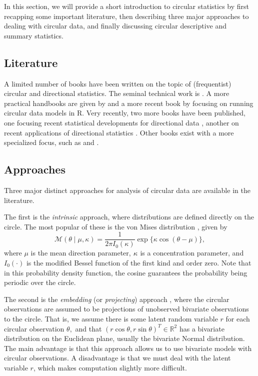 \documentclass[12pt, a4paper]{book}\usepackage[]{graphicx}\usepackage[]{color}
\let\proglang=\textsf
\begin{document}
In this section, we will provide a short introduction to circular statistics by first recapping some important literature, then describing three major approaches to dealing with circular data, and finally discussing circular descriptive and summary statistics.

\subsection*{Literature}

A limited number of books have been written on the topic of (frequentist) circular and directional statistics. The seminal technical work is \citet{mardia2009directional}. A more practical handbooks are given by \citet{fisher1995statistical} and a more recent book by \citet{pewsey2013circular} focusing on running circular data models in \proglang{R}. Very recently, two more books have been published, one focusing recent statistical developments for directional data \citep{ley2017modern}, another on recent applications of directional statistics \citep{ley2018applied}. Other books exist with a more specialized focus, such as \citet{batschelet1981circular} and \citet{jammalamadaka2001topics}.

\subsection*{Approaches}

Three major distinct approaches for analysis of circular data are available in the literature.

The first is the \textit{intrinsic} approach, where distributions are defined directly on the circle. The most popular of these is the von Mises distribution \cite{von1918ganzzahligkeit}, given by
\begin{equation}
\mathcal{M}(\theta \mid \mu, \kappa) = \frac{1}{2 \pi I_0(\kappa)} \exp\{\kappa \cos(\theta - \mu)\},
\end{equation}
where $\mu$ is the mean direction parameter, $\kappa$ is a concentration parameter, and $I_0(\cdot)$ is the modified Bessel function of the first kind and order zero. Note that in this probability density function, the cosine guarantees the probability being periodic over the circle.

The second is the  \textit{embedding} (or \textit{projecting}) approach \citep{presnell1998projected, Nunez-Antonio2005}, where the circular observations are assumed to be projections of unobserved bivariate observations to the circle. That is, we assume there is some latent random variable $r$ for each circular observation $\theta,$ and that $(r \cos\theta, r \sin\theta)^T \in \mathbb{R}^2$  has a bivariate distribution on the Euclidean plane, usually the bivariate Normal distribution. The main advantage is that this approach allows us to use bivariate models with circular observations. A disadvantage is that we must deal with the latent variable $r$, which makes computation slightly more difficult.
\end{document}
